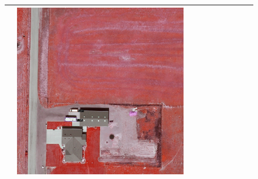 \begin{figure}[H]
\begin{tabularx}{\textwidth}{c|*{9}{X}}
    & \includegraphics[trim={300pt 355pt 610pt 570pt},clip,width=\linewidth]{images/015Results/02perm_exp/comp_images/rgir/198.png} \\ \hline


\end{tabularx}
\end{figure}
